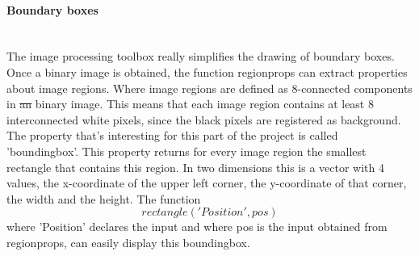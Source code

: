 \documentclass{article}
\providecommand{\DIFaddtex}[1]{{\protect\color{blue}\uwave{#1}}} %
\providecommand{\DIFdeltex}[1]{{\protect\color{red}\sout{#1}}}                      %
\providecommand{\DIFaddbegin}{} %
\providecommand{\DIFaddend}{} %
\providecommand{\DIFdelbegin}{} %
\providecommand{\DIFdelend}{} %
\providecommand{\DIFadd}[1]{\texorpdfstring{\DIFaddtex{#1}}{#1}} %
\providecommand{\DIFdel}[1]{\texorpdfstring{\DIFdeltex{#1}}{}} %
\newcommand{\DIFscaledelfig}{0.5}
\newlength{\DIFdelgraphicswidth} %
\newlength{\DIFdelgraphicsheight} %
\newcommand{\DIFaddincludegraphics}[2][]{{\color{blue}\fbox{\DIFOincludegraphics[#1]{#2}}}} %
\newcommand{\DIFdelincludegraphics}[2][]{%
\sbox{\DIFdelgraphicsbox}{\DIFOincludegraphics[#1]{#2}}%
\settoboxwidth{\DIFdelgraphicswidth}{\DIFdelgraphicsbox} %
\settoboxtotalheight{\DIFdelgraphicsheight}{\DIFdelgraphicsbox} %
\scalebox{\DIFscaledelfig}{%
\parbox[b]{\DIFdelgraphicswidth}{\usebox{\DIFdelgraphicsbox}\\[-\baselineskip] \rule{\DIFdelgraphicswidth}{0em}}\llap{\resizebox{\DIFdelgraphicswidth}{\DIFdelgraphicsheight}{%
\setlength{\unitlength}{\DIFdelgraphicswidth}%
\begin{picture}(1,1)%
\thicklines\linethickness{2pt} %
{\color[rgb]{1,0,0}\put(0,0){\framebox(1,1){}}}%
{\color[rgb]{1,0,0}\put(0,0){\line( 1,1){1}}}%
{\color[rgb]{1,0,0}\put(0,1){\line(1,-1){1}}}%
\end{picture}%
}\hspace*{3pt}}} %
} %
\DeclareRobustCommand{\DIFaddbegin}{\DIFOaddbegin \let\includegraphics\DIFaddincludegraphics} %
\DeclareRobustCommand{\DIFaddend}{\DIFOaddend \let\includegraphics\DIFOincludegraphics} %
\DeclareRobustCommand{\DIFdelbegin}{\DIFOdelbegin \let\includegraphics\DIFdelincludegraphics} %
\DeclareRobustCommand{\DIFdelend}{\DIFOaddend \let\includegraphics\DIFOincludegraphics} %
\begin{document}
\paragraph{Boundary boxes}\mbox{}\\
The image processing toolbox really simplifies the drawing of boundary boxes. Once a binary image is obtained, the function regionprops \cite{Mathworks} can extract properties about image regions. Where image regions are defined as 8-connected components in \DIFdelbegin \DIFdel{an }\DIFdelend \DIFaddbegin \DIFadd{a }\DIFaddend binary image. This means that each image region contains at least 8 interconnected white pixels, since the black pixels are registered as background. The property that's interesting for this part of the project is called 'boundingbox'. This property returns for every image region the smallest rectangle that contains this region. In two dimensions this is a vector with 4 values, the x-coordinate of the upper left corner, the y-coordinate of that corner, the width and the height. The function 
\begin{equation}
rectangle('Position', pos)
\end{equation}
where 'Position' declares the input and where pos is the input obtained from regionprops, can easily display this boundingbox. 
\end{document}
